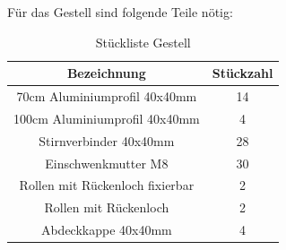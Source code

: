 Für das Gestell sind folgende Teile nötig:
\begin{table}[H]
    \centering
    \begin{tabular}{ | c | c | } 
  \hline
   \textbf{Bezeichnung} & \textbf{Stückzahl}\\ 
  \hline
   70cm Aluminiumprofil 40x40mm & 14\\ 
  \hline
   100cm Aluminiumprofil 40x40mm & 4 \\ 
  \hline
  Stirnverbinder 40x40mm & 28 \\ 
  \hline
  Einschwenkmutter M8 & 30 \\ 
  \hline
  Rollen mit Rückenloch fixierbar & 2 \\ 
  \hline
  Rollen mit Rückenloch & 2 \\ 
  \hline
  Abdeckkappe 40x40mm & 4 \\ 
  \hline
\end{tabular}
    \caption{Stückliste Gestell}
\end{table}





